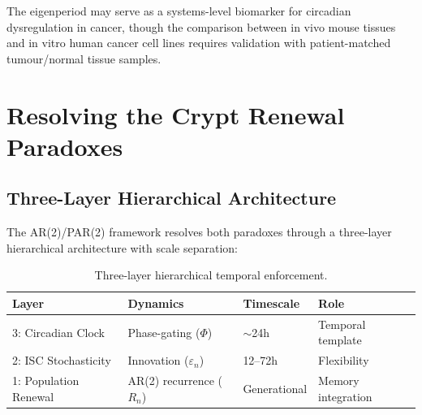 \documentclass[11pt,letterpaper]{article}
\begin{document}
The eigenperiod may serve as a systems-level biomarker for circadian dysregulation in cancer, though the comparison between in vivo mouse tissues and in vitro human cancer cell lines requires validation with patient-matched tumour/normal tissue samples.



\section{Resolving the Crypt Renewal Paradoxes}
\label{sec:paradox}

\subsection{Three-Layer Hierarchical Architecture}

The AR(2)/PAR(2) framework resolves both paradoxes through a three-layer hierarchical architecture with scale separation:

\begin{table}[H]
\centering
\caption{Three-layer hierarchical temporal enforcement.}
\label{tab:layers}
\begin{tabular}{llll}
\toprule
\textbf{Layer} & \textbf{Dynamics} & \textbf{Timescale} & \textbf{Role} \\
\midrule
3: Circadian Clock & Phase-gating ($\Phi$) & $\sim$24h & Temporal template \\
2: ISC Stochasticity & Innovation ($\varepsilon_n$) & 12--72h & Flexibility \\
1: Population Renewal & AR(2) recurrence ($R_n$) & Generational & Memory integration \\
\bottomrule
\end{tabular}
\end{table}
\end{document}
